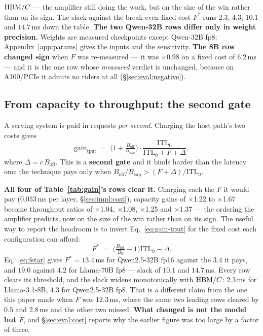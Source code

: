 \begin{table}[t]
{{$\mathrm{HBM}/C$} --- the amplifier still doing the work, but on the size of the win
rather than on its sign. The slack against the break-even fixed cost $F^{*}$ runs
$2.3$, $4.3$, $10.1$ and $14.7$\,ms down the table.
\textbf{The two Qwen-32B rows differ only in weight precision.} Weights are
measured checkpoints except Qwen-32B fp8; Appendix~\ref{app:params} gives the
inputs and the sensitivity.
\textbf{The 8B row changed sign} when $F$ was re-measured --- it was
$\times 0.98$ on a fixed cost of $6.2$\,ms --- and it is the one row whose
\emph{measured} verdict is unchanged, because on A100/PCIe it admits no riders at
all (\S\ref{sec:eval:negative}).}
\label{tab:gain}
\end{table}

\subsection{From capacity to throughput: the second gate}
\label{sec:model:omits}

A serving system is paid in requests \emph{per second}. Charging the host path's
two costs gives
%
\begin{equation}
\label{eq:gain-tput}
\text{gain}_{\text{tput}} \;=\;
  \Big(1 + \tfrac{B_{\mathrm{off}}}{B_{\mathrm{cap}}}\Big)
  \cdot \frac{\mathrm{ITL}_0}{\mathrm{ITL}_0 + F + \Delta},
\end{equation}
%
where $\Delta = c\,B_{\mathrm{off}}$. This is a \textbf{second gate} and it binds
harder than the latency one: the technique pays only when
$B_{\mathrm{off}}/B_{\mathrm{cap}} > (F + \Delta)/\mathrm{ITL}_0$.

\textbf{All four of Table~\ref{tab:gain}'s rows clear it.} Charging each the $F$ it
would pay ($0.053$\,ms per layer, \S\ref{sec:impl:cost}), capacity gains of
$\times$1.22 to $\times$1.67 become throughput ratios of $\times$1.04,
$\times$1.08, $\times$1.25 and $\times$1.37 --- the ordering the amplifier
predicts, now on the size of the win rather than on its sign. The useful way to
report the headroom is to invert Eq.~\ref{eq:gain-tput} for the fixed cost each
configuration can afford:
%
\begin{equation}
\label{eq:fstar}
F^{*} \;=\; \Big(\tfrac{B_{\mathrm{tot}}}{B_0} - 1\Big)\mathrm{ITL}_0 - \Delta.
\end{equation}
%
Eq.~\ref{eq:fstar} gives $F^{*} = 13.4$\,ms for Qwen2.5-32B fp16 against the
$3.4$ it pays, and $19.0$ against $4.2$ for Llama-70B fp8 --- slack of $10.1$ and
$14.7$\,ms. Every row clears its threshold, and the slack widens monotonically
with $\mathrm{HBM}/C$: $2.3$\,ms for Llama-3.1-8B, $4.3$ for Qwen2.5-32B fp8. That is a
different claim from the one this paper made when $F$ was $12.3$\,ms, where the
same two leading rows cleared by $0.5$ and $2.8$\,ms and the other two missed.
\textbf{What changed is not the model but $F$}, and \S\ref{sec:eval:cost} reports
why the earlier figure was too large by a factor of three.

